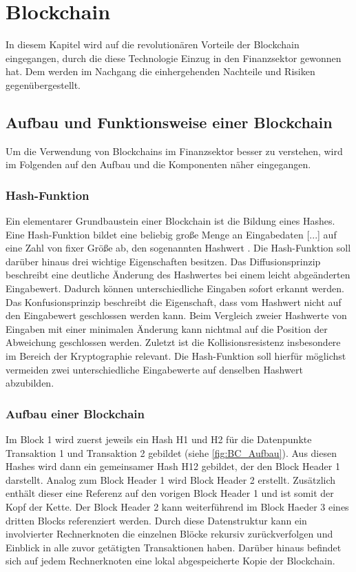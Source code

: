 \section{Blockchain}
In diesem Kapitel wird auf die revolutionären Vorteile der Blockchain 
eingegangen, durch die diese Technologie Einzug in den Finanzsektor gewonnen 
hat. Dem werden im Nachgang die einhergehenden Nachteile und Risiken gegenübergestellt. 

\subsection{Aufbau und Funktionsweise einer Blockchain}
Um die Verwendung von Blockchains im Finanzsektor besser zu verstehen,
wird im Folgenden auf den Aufbau und die Komponenten näher eingegangen.


\subsubsection{Hash-Funktion}
Ein elementarer Grundbaustein einer Blockchain ist die Bildung eines Hashes.
\glqq Eine Hash-Funktion bildet eine beliebig große Menge an Eingabedaten [...] auf eine Zahl von 
fixer Größe ab, den sogenannten Hashwert\grqq{} \cite[p.~6]{fill2020blockchain}.
Die Hash-Funktion soll darüber hinaus drei wichtige Eigenschaften besitzen.
Das Diffusionsprinzip beschreibt eine deutliche Änderung des Hashwertes bei einem leicht
abgeänderten Eingabewert. Dadurch können unterschiedliche Eingaben sofort erkannt werden.
Das Konfusionsprinzip beschreibt die Eigenschaft, dass vom Hashwert nicht auf den Eingabewert
geschlossen werden kann. Beim Vergleich zweier Hashwerte von Eingaben mit einer minimalen
Änderung kann nichtmal auf die Position der Abweichung geschlossen werden.
Zuletzt ist die Kollisionsresistenz insbesondere im Bereich der Kryptographie relevant.
Die Hash-Funktion soll hierfür möglichst vermeiden zwei unterschiedliche Eingabewerte
auf denselben Hashwert abzubilden.
\cite[p.~6ff]{fill2020blockchain} 

\subsubsection{Aufbau einer Blockchain}
Im Block 1 wird zuerst jeweils ein Hash H1 und H2 für die Datenpunkte Transaktion 1 
und Transaktion 2 gebildet (siehe \autoref{fig:BC_Aufbau}). Aus diesen Hashes wird dann ein gemeinsamer Hash H12 gebildet, 
der den Block Header 1 darstellt.
Analog zum Block Header 1 wird Block Header 2 erstellt. Zusätzlich enthält dieser eine
Referenz auf den vorigen Block Header 1 und ist somit der Kopf der Kette. Der Block Header 2
kann weiterführend im Block Haeder 3 eines dritten Blocks referenziert werden. 
Durch diese Datenstruktur kann ein involvierter Rechnerknoten die einzelnen Blöcke rekursiv
zurückverfolgen und Einblick in alle zuvor getätigten Transaktionen haben. Darüber
hinaus befindet sich auf jedem Rechnerknoten eine lokal abgespeicherte Kopie der 
Blockchain.
\cite[p.~17f]{fill2020blockchain}

